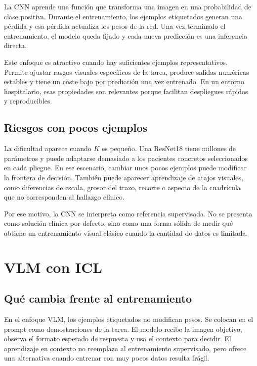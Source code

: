 La CNN aprende una función que transforma una imagen en una probabilidad de clase positiva. Durante el entrenamiento, los ejemplos etiquetados generan una pérdida y esa pérdida actualiza los pesos de la red. Una vez terminado el entrenamiento, el modelo queda fijado y cada nueva predicción es una inferencia directa.

Este enfoque es atractivo cuando hay suficientes ejemplos representativos. Permite ajustar rasgos visuales específicos de la tarea, produce salidas numéricas estables y tiene un coste bajo por predicción una vez entrenado. En un entorno hospitalario, esas propiedades son relevantes porque facilitan despliegues rápidos y reproducibles.

\subsection{Riesgos con pocos ejemplos}

La dificultad aparece cuando \(K\) es pequeño. Una ResNet18 tiene millones de parámetros y puede adaptarse demasiado a los pacientes concretos seleccionados en cada pliegue. En ese escenario, cambiar unos pocos ejemplos puede modificar la frontera de decisión. También puede aparecer aprendizaje de atajos visuales, como diferencias de escala, grosor del trazo, recorte o aspecto de la cuadrícula que no corresponden al hallazgo clínico.

Por ese motivo, la CNN se interpreta como referencia supervisada. No se presenta como solución clínica por defecto, sino como una forma sólida de medir qué obtiene un entrenamiento visual clásico cuando la cantidad de datos es limitada.

\section{VLM con ICL}

\subsection{Qué cambia frente al entrenamiento}

En el enfoque VLM, los ejemplos etiquetados no modifican pesos. Se colocan en el prompt como demostraciones de la tarea. El modelo recibe la imagen objetivo, observa el formato esperado de respuesta y usa el contexto para decidir. El aprendizaje en contexto no reemplaza al entrenamiento supervisado, pero ofrece una alternativa cuando entrenar con muy pocos datos resulta frágil.

